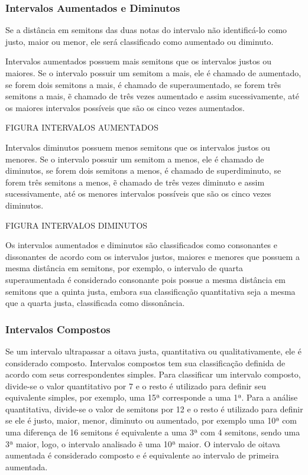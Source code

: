       \subsubsection[Intervalos Aumentados e Diminutos]{Intervalos Aumentados e Diminutos}

        Se a distância em semitons das duas notas do intervalo não identificá-lo como justo, maior ou menor, ele será classificado como aumentado ou diminuto.

        Intervalos aumentados possuem mais semitons que os intervalos justos ou maiores. Se o intervalo possuir um semitom a mais, ele é chamado de aumentado, se forem dois semitons a mais, é chamado de superaumentado, se forem três semitons a mais, ẽ chamado de três vezes aumentado e assim sucessivamente, até os maiores intervalos possíveis que são os cinco vezes aumentados.

        FIGURA INTERVALOS AUMENTADOS

        Intervalos diminutos possuem menos semitons que os intervalos justos ou menores. Se o intervalo possuir um semitom a menos, ele é chamado de diminutos, se forem dois semitons a menos, é chamado de superdiminuto, se forem três semitons a menos, ẽ chamado de três vezes diminuto e assim sucessivamente, até os menores intervalos possíveis que são os cinco vezes diminutos.

        FIGURA INTERVALOS DIMINUTOS

        Os intervalos aumentados e diminutos são classificados como consonantes e dissonantes de acordo com os intervalos justos, maiores e menores que possuem a mesma distância em semitons, por exemplo, o intervalo de quarta superaumentada é considerado consonante pois possue a mesma distância em semitons que a quinta justa, embora sua classificação quantitativa seja a mesma que a quarta justa, classificada como dissonância.

      \subsubsection[Intervalos Compostos]{Intervalos Compostos}

        Se um intervalo ultrapassar a oitava justa, quantitativa ou qualitativamente, ele é considerado composto. Intervalos compostos tem sua classificação definida de acordo com seus correspondentes simples. Para classificar um intervalo composto, divide-se o valor quantitativo por 7 e o resto é utilizado para definir seu equivalente simples, por exemplo, uma 15ª corresponde a uma 1ª. Para a análise quantitativa, divide-se o valor de semitons por 12 e o resto é utilizado para definir se ele é justo, maior, menor, diminuto ou aumentado, por exemplo uma 10ª com uma diferença de 16 semitons é equivalente a uma 3ª com 4 semitons, sendo uma 3ª maior, logo, o intervalo analisado ẽ uma 10ª maior. O intervalo de oitava aumentada é considerado composto e é equivalente ao intervalo de primeira aumentada.

